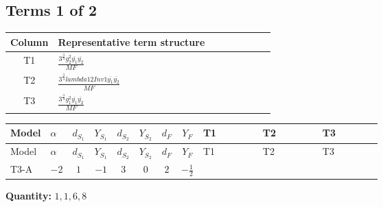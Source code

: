 \documentclass[8pt]{article}
\begin{document}
\begin{landscape}
\subsection*{Terms 1 of 2}
\begin{center}
\begin{tabular}{@{}c >{\raggedright\arraybackslash}p{0.82\linewidth}@{}}
\toprule
Column & Representative term structure \\
\midrule
T1 & \(\displaystyle \frac{3^{\frac{3}{4}} g_{2}^{2} \overline{y_{1}} \overline{y_{2}}}{MF}\) \\
\midrule
T2 & \(\displaystyle \frac{3^{\frac{3}{4}} lambda12Inv1 \overline{y_{1}} \overline{y_{2}}}{MF}\) \\
\midrule
T3 & \(\displaystyle \frac{3^{\frac{3}{4}} g_{1}^{2} \overline{y_{1}} \overline{y_{2}}}{MF}\) \\
\midrule
\bottomrule
\end{tabular}
\end{center}
\smallskip
\tiny
\begin{longtable}{@{}llcccccc >{\raggedright\arraybackslash}p{0.21\linewidth} >{\raggedright\arraybackslash}p{0.21\linewidth} >{\raggedright\arraybackslash}p{0.21\linewidth}@{}}
\toprule
Model & $\alpha$ & $d_{S_1}$ & $Y_{S_1}$ & $d_{S_2}$ & $Y_{S_2}$ & $d_F$ & $Y_F$ & T1 & T2 & T3 \\
\midrule
\endfirsthead
\toprule
Model & $\alpha$ & $d_{S_1}$ & $Y_{S_1}$ & $d_{S_2}$ & $Y_{S_2}$ & $d_F$ & $Y_F$ & T1 & T2 & T3 \\
\midrule
\endhead
T3-A & $-2$ & $1$ & $-1$ & $3$ & $0$ & $2$ & $-\frac{1}{2}$ & \scriptsize\adjustbox{max width=\linewidth}{$\begin{gathered} - \frac{11 \cdot 3^{\frac{3}{4}} g_{2}^{2} \overline{y_{1}} \overline{y_{2}}}{8 MF}\end{gathered}$} & \scriptsize\adjustbox{max width=\linewidth}{$\begin{gathered} - \frac{3^{\frac{3}{4}} lambda12Inv1 \overline{y_{1}} \overline{y_{2}}}{6 MF}\end{gathered}$} & \scriptsize\adjustbox{max width=\linewidth}{$\begin{gathered} - \frac{3^{\frac{3}{4}} g_{1}^{2} \overline{y_{1}} \overline{y_{2}}}{8 MF}\end{gathered}$} \\
\midrule
\bottomrule
\end{longtable}
\clearpage
\noindent\textbf{Quantity: }$\mathrm{1,1,6,8}$\par\smallskip

\end{landscape}
\end{document}
